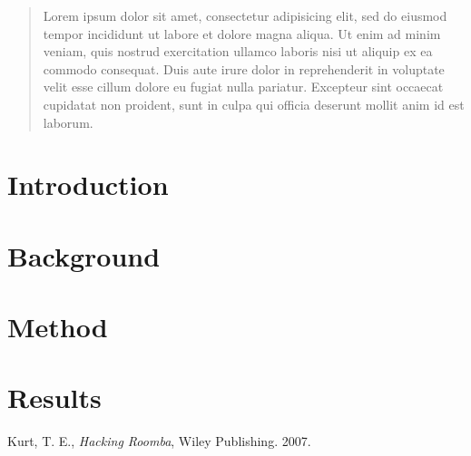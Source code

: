 \documentclass[a4paper,titlepage,final]{article}
\begin{document}

\setcounter{page}{0}

\begin{spacing}{1.5}
\begin{abstract}
	Lorem ipsum dolor sit amet, consectetur adipisicing elit, sed do eiusmod tempor incididunt ut labore et dolore magna aliqua. Ut enim ad minim veniam, quis nostrud exercitation ullamco laboris nisi ut aliquip ex ea commodo consequat. Duis aute irure dolor in reprehenderit in voluptate velit esse cillum dolore eu fugiat nulla pariatur. Excepteur sint occaecat cupidatat non proident, sunt in culpa qui officia deserunt mollit anim id est laborum.
\end{abstract}
\end{spacing}

\tableofcontents
\newpage


\section{Introduction}


\section{Background}


\section{Method}


\section{Results}



%
%
%
%
%

\newpage
{}
\begin{thebibliography}{9}
	  Kurt, T. E.,
	  \emph{Hacking Roomba},
	  Wiley Publishing.
	  2007.
\end{thebibliography}

\newpage
\appendix
\end{document}
